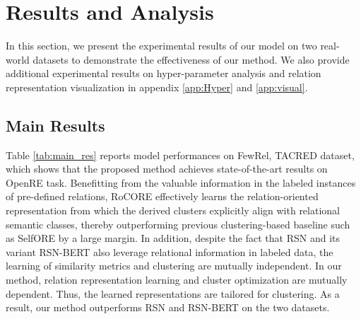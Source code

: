 \documentclass[11pt]{article}
\begin{document}
\section{Results and Analysis}   
    In this section, we present the experimental results of our model on two real-world datasets to demonstrate the effectiveness of our method. We also provide additional experimental results on hyper-parameter analysis and relation representation visualization in appendix \ref{app:Hyper} and \ref{app:visual}.\subsection{Main Results}
        
        Table \ref{tab:main_res} reports model performances on FewRel, TACRED dataset, which shows that the proposed method achieves state-of-the-art results on OpenRE task. Benefitting from the valuable information in the labeled instances of pre-defined relations, RoCORE effectively learns the relation-oriented representation from which the derived clusters explicitly align with relational semantic classes, thereby outperforming previous clustering-based baseline such as SelfORE by a large margin. 
        In addition, despite the fact that RSN and its variant RSN-BERT also leverage relational information in labeled data, 
the learning of similarity metrics and clustering are mutually independent. In our method, relation representation learning and cluster optimization are mutually dependent. Thus, the learned representations are tailored for clustering. As a result, our method outperforms RSN and RSN-BERT on the two datasets.
        
        
\end{document}
